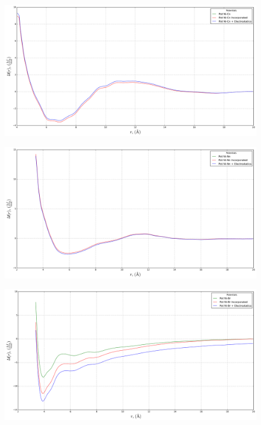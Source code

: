 \documentclass[10pt,a4paper,twoside]{article}
\begin{document}
\begin{figure}[H]
  \begin{center}
	\includegraphics[width=0.8 \textwidth]{./graphs/PtsChargedSys1}
  \end{center}
\end{figure}

\begin{figure}[H]
  \begin{center}
	\includegraphics[width=0.8 \textwidth]{./graphs/PtsChargedSys2}
  \end{center}
\end{figure}

\begin{figure}[H]
  \begin{center}
	\includegraphics[width=0.8 \textwidth]{./graphs/PtsChargedSys3}
  \end{center}
\end{figure}
\end{document}
